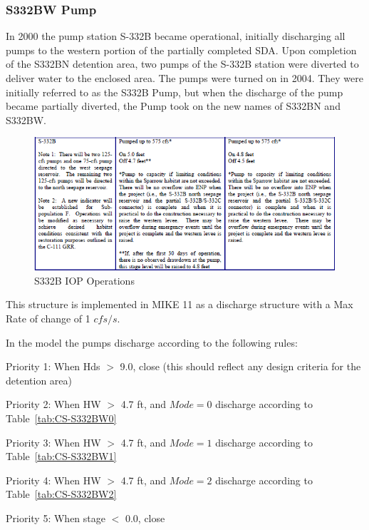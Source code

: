 \clearpage
\subsubsection{S332BW Pump}
In 2000 the pump station S-332B became operational, initially discharging all pumps to the western portion of the partially completed SDA.
Upon completion of the S332BN detention area, two pumps of the S-332B station were diverted to deliver water to the enclosed area.
The pumps were turned on in 2004. They were initially referred to as the S332B Pump, but when the discharge of the pump became partially diverted, the Pump took on the new names of S332BN and S332BW.

\begin{figure}[!h]
  \begin{center}
  \includegraphics[width=6.5in]{../figs/S332B_IOPops.png}
  \caption{S332B IOP Operations}
  \label{fig:S332BWiop}
  \end{center}
\end{figure}

This structure is implemented in MIKE 11 as a discharge structure with a Max Rate of change of 1 $cfs/s$.

In the model the pumps discharge according to the following rules:

\begin{packed_items}
\item Priority 1: When Hds $>$ 9.0, close (this should reflect any design criteria for the detention area)
\item Priority 2: When HW $>$ 4.7 ft, and $Mode=0$ discharge according to Table~\ref{tab:CS-S332BW0}
\item Priority 3: When HW $>$ 4.7 ft, and $Mode=1$ discharge according to Table~\ref{tab:CS-S332BW1}
\item Priority 4: When HW $>$ 4.7 ft, and $Mode=2$ discharge according to Table~\ref{tab:CS-S332BW2}
\item Priority 5: When stage $<$ 0.0, close
\end{packed_items}

